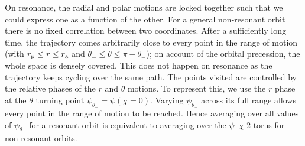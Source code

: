 On resonance, the radial and polar motions are locked together such that we could express one as a function of the other. For a general non-resonant orbit there is no fixed correlation between two coordinates. After a sufficiently long time, the trajectory comes arbitrarily close to every point in the range of motion (with $r_\mathrm{p} \leq r \leq r_\mathrm{a}$ and $\theta_- \leq \theta \leq \pi - \theta_-$); on account of the orbital precession, the whole space is densely covered. This does not happen on resonance as the trajectory keeps cycling over the same path. The points visited are controlled by the relative phases of the $r$ and $\theta$ motions. To represent this, we use the $r$ phase at the $\theta$ turning point $\psi_{\theta_-} = \psi(\chi = 0)$. Varying $\psi_{\theta_-}$ across its full range allows every point in the range of motion to be reached. Hence averaging over all values of $\psi_{\theta_-}$ for a resonant orbit is equivalent to averaging over the $\psi$--$\chi$ $2$-torus for non-resonant orbits.


